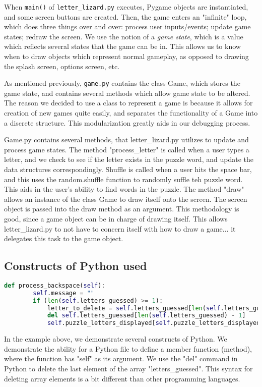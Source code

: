\documentclass[11pt]{article}
\begin{document}
	When \texttt{main()} of \texttt{letter\_lizard.py} executes, Pygame objects are instantiated, and some screen buttons are created. Then, the game enters an "infinite" loop, which does three things over and over: process user inputs/events; update game states; redraw the screen. We use the notion of a \emph{game state}, which is a value which reflects several states that the game can be in. This allows us to know when to draw objects which represent normal gameplay, as opposed to drawing the splash screen, options screen, etc.
	
	As mentioned previously, \texttt{game.py} contains the class Game, which stores the game state, and contains several methods which allow game state to be altered. The reason we decided to use a class to represent a game is because it allows for creation of new games quite easily, and separates the functionality of a Game into a discrete structure. This modularization greatly aids in our debugging process.
	
	Game.py contains several methods, that letter\_lizard.py utilizes to update and process game states. The method "process\_letter" is called when a user types a letter, and we check to see if the letter exists in the puzzle word, and update the data structures correspondingly. Shuffle is called when a user hits the space bar, and this uses the random.shuffle function to randomly suffle teh puzzle word. This aids in the user's ability to find words in the puzzle. The method "draw" allows an instance of the class Game to draw itself onto the screen. The screen object is passed into the draw method as an argument. This methodology is good, since a game object can be in charge of drawing itself. This allows letter\_lizard.py to not have to concern itself with how to draw a game... it delegates this task to the game object.
	
	
\subsection{Constructs of Python used}

\begin{minipage}[t]{1\linewidth}
\begin{lstlisting}[language=Python, %
  title={}, label=bash1]
    def process_backspace(self):
        self.message = ""
        if (len(self.letters_guessed) >= 1):
            letter_to_delete = self.letters_guessed[len(self.letters_guessed) - 1]
            del self.letters_guessed[len(self.letters_guessed) - 1]
            self.puzzle_letters_displayed[self.puzzle_letters_displayed.index('')] = letter_to_delete
\end{lstlisting}
\end{minipage}
In the example above, we demonstrate several constructs of Python. We demonstrate the ability for a Python file to define a member function (method), where the function has "self" as its argument. We use the "del" command in Python to delete the last element of the array "letters\_guessed". This syntax for deleting array elements is a bit different than other programming languages.
\end{document}

